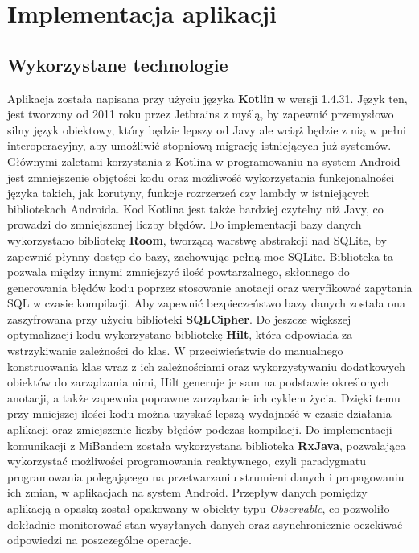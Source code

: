 \chapter{Implementacja aplikacji}
\thispagestyle{chapterBeginStyle}
\label{rozdzial3}

\section{Wykorzystane technologie}
Aplikacja została napisana przy użyciu języka \textbf{Kotlin} w wersji 1.4.31. Język ten, jest tworzony od 2011 roku przez Jetbrains z myślą, by zapewnić przemysłowo silny język obiektowy, który będzie lepszy od Javy ale wciąż będzie z nią w pełni interoperacyjny, aby umożliwić stopniową migrację istniejących już systemów. Głównymi zaletami korzystania z Kotlina w programowaniu na system Android jest zmniejszenie objętości kodu oraz możliwość wykorzystania funkcjonalności języka takich, jak korutyny, funkcje rozrzerzeń czy lambdy w istniejących bibliotekach Androida. Kod Kotlina jest także bardziej czytelny niż Javy, co prowadzi do zmniejszonej liczby błędów. 
\newline\newline
\indent Do implementacji bazy danych wykorzystano bibliotekę \textbf{Room}, tworzącą warstwę abstrakcji nad SQLite, by zapewnić płynny dostęp do bazy, zachowując pełną moc SQLite. Biblioteka ta pozwala między innymi zmniejszyć ilość powtarzalnego, skłonnego do generowania błędów kodu poprzez stosowanie anotacji oraz weryfikować zapytania SQL w czasie kompilacji. Aby zapewnić bezpieczeństwo bazy danych została ona zaszyfrowana przy użyciu biblioteki \textbf{SQLCipher}.
\newline\newline
\indent Do jeszcze większej optymalizacji kodu wykorzystano bibliotekę \textbf{Hilt}, która odpowiada za wstrzykiwanie zależności do klas. W przeciwieństwie do manualnego konstruowania klas wraz z ich zależnościami oraz wykorzystywaniu dodatkowych obiektów do zarządzania nimi, Hilt generuje je sam na podstawie określonych anotacji, a także zapewnia poprawne zarządzanie ich cyklem życia. Dzięki temu przy mniejszej ilości kodu można uzyskać lepszą wydajność w czasie działania aplikacji oraz zmiejszenie liczby błędów podczas kompilacji.
\newline\newline
\indent Do implementacji komunikacji z MiBandem została wykorzystana biblioteka \textbf{RxJava}, pozwalająca wykorzystać możliwości programowania reaktywnego, czyli paradygmatu programowania polegającego na przetwarzaniu strumieni danych i propagowaniu ich zmian, w aplikacjach na system Android. Przepływ danych pomiędzy aplikacją a opaską został opakowany w obiekty typu \textit{Observable}, co pozwoliło dokładnie monitorować stan wysyłanych danych oraz asynchronicznie oczekiwać odpowiedzi na poszczególne operacje.

